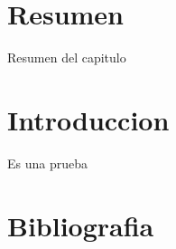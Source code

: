 \section{Resumen}
Resumen del capitulo
\section{Introduccion}
\cite{acemoglu2000} Es una prueba
\section{Bibliografia}
\printbibliography[heading=subbibliography]
